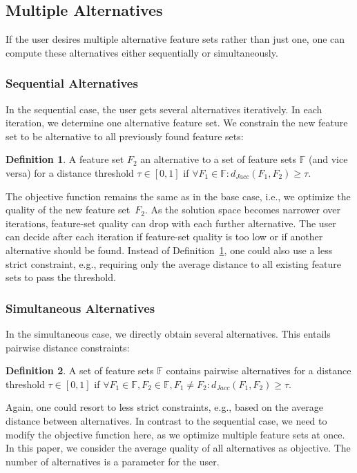 \documentclass{article}
\theoremstyle{definition}
\newtheorem{definition}{Definition}
\begin{document}
\subsection{Multiple Alternatives}

If the user desires multiple alternative feature sets rather than just one, one can compute these alternatives either sequentially or simultaneously.

\subsubsection{Sequential Alternatives}

In the sequential case, the user gets several alternatives iteratively.
In each iteration, we determine one alternative feature set.
We constrain the new feature set to be alternative to all previously found feature sets:
%
\begin{definition}
	A feature set $F_2$ an alternative to a set of feature sets $\mathbb{F}$ (and vice versa) for a distance threshold $\tau \in [0,1]$ if $\forall F_1 \in \mathbb{F}: d_{Jacc}(F_1,F_2) \geq \tau$.
	\label{def:sequential-alternative}
\end{definition}
%
The objective function remains the same as in the base case, i.e., we optimize the quality of the new feature set~$F_2$.
As the solution space becomes narrower over iterations, feature-set quality can drop with each further alternative.
The user can decide after each iteration if feature-set quality is too low or if another alternative should be found.
Instead of Definition~\ref{def:sequential-alternative}, one could also use a less strict constraint, e.g., requiring only the average distance to all existing feature sets to pass the threshold.

\subsubsection{Simultaneous Alternatives}

In the simultaneous case, we directly obtain several alternatives.
This entails pairwise distance constraints:
%
\begin{definition}
	A set of feature sets $\mathbb{F}$ contains pairwise alternatives for a distance threshold $\tau \in [0,1]$ if $\forall F_1 \in \mathbb{F}, F_2 \in \mathbb{F}, F_1 \neq F_2: d_{Jacc}(F_1,F_2) \geq \tau$.
	\label{def:simultaneous-alternative}
\end{definition}
%
Again, one could resort to less strict constraints, e.g., based on the average distance between alternatives.
In contrast to the sequential case, we need to modify the objective function here, as we optimize multiple feature sets at once.
In this paper, we consider the average quality of all alternatives as objective.
The number of alternatives is a parameter for the user.
\end{document}
